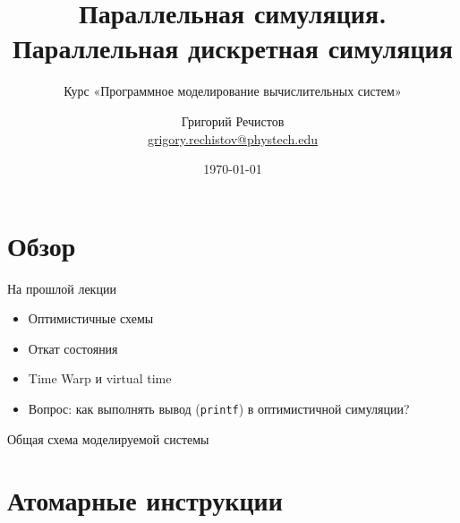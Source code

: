 \documentclass{beamer}
\title{Параллельная симуляция. Параллельная дискретная симуляция}
\subtitle{Курс «Программное моделирование вычислительных систем»}
\author[]{Григорий Речистов \\ \small{\href{mailto:grigory.rechistov@phystech.edu}{grigory.rechistov@phystech.edu}}}
\date{\today}
\begin{document}
\begin{frame}
\titlepage
\end{frame}

\begin{frame}
\tableofcontents
\end{frame} 

\section{Обзор}

\begin{frame}{На прошлой лекции}
\begin{itemize}
\item Оптимистичные схемы
\item Откат состояния 
\item Time Warp и virtual time \pause
\item Вопрос: как выполнять вывод (\texttt{printf}) в оптимистичной симуляции?
\end{itemize}

\end{frame}

\begin{frame}{Общая схема моделируемой системы}

\centering


    
\end{frame}


\section{Атомарные инструкции}
\end{document}

